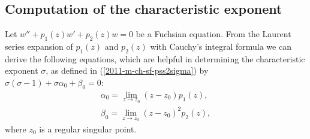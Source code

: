 \subsection{Computation of the characteristic exponent}

 Let
 $w'' +p_1(z)w' +p_2(z)w=0$
be a Fuchsian equation.
From the Laurent series expansion of $p_1(z)$ and $p_2(z)$ with Cauchy's integral formula  we can derive
the following equations, which are helpful in determining the characteristic exponent $\sigma$,
as defined in (\ref{2011-m-ch-sf-pss2sigma}) by
$
\sigma({\sigma-1}) +  \sigma \alpha_{0} + \beta_{0}           =   0
$:
\begin{equation}
\begin{split}
\alpha_0=\lim_{z\rightarrow z_0} (z-z_0)p_1(z),\\
\beta_0=\lim_{z\rightarrow z_0} (z-z_0)^2p_2(z),
\end{split}
\end{equation}
 where $z_0$ is a regular singular point.


